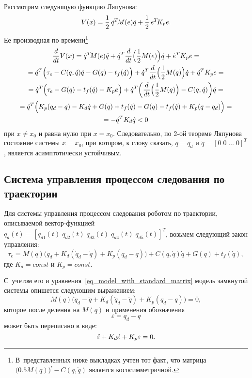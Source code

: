 Рассмотрим следующую функцию Ляпунова:
\begin{equation}
    V(x) = \frac{1}{2} \, \dot{q}^T \! M(e) \dot{q} + \frac{1}{2} \, e^T \! K_p e \ldotp
\end{equation}
Ее производная по времени\footnote{В~представленных ниже выкладках учтен тот факт, что матрица \linebreak $\bigl( 0.5 M(q) \bigr)^\centerdot \!\! - C(q,\dot{q})$ является кососимметричной.}
\begin{gather}
    \frac{d}{dt} V(x) = \dot{q}^T \! M(e) \ddot{q} + \dot{q}^T \frac{d}{dt} \Bigl( \frac{1}{2} M(e) \Bigr) \dot{q} + \dot{e}^T K_p e = \notag \\
    = \dot{q}^T \Bigl( \tau_e - C(q,\dot{q}) \dot{q} - G(q) - t_f(\dot{q}) \Bigr) + \dot{q}^T \frac{d}{dt} \Bigl( \frac{1}{2} M(q) \Bigr) \dot{q} + \dot{q}^T K_p e  = \notag\\
    = \dot{q}^T \Bigl( \tau_e - G(q) - t_f(\dot{q}) + K_p e\Bigr) + \dot{q}^T \biggl( \frac{d}{dt} \Bigl( \frac{1}{2} M(q) \Bigr) - C(q,\dot{q}) \biggr) \dot{q} = \notag \\
    = \dot{q}^T \Bigl(K_p (q_d - q) - K_d \dot{q} + G(q) + t_f(\dot{q}) - G(q) - t_f(\dot{q}) + K_p (q - q_d) \Bigr) = \notag \\
    = -\dot{q}^T K_d \dot{q} < 0
\end{gather}
при $x \ne x_0$ и равна нулю при $x = x_0$.
Следовательно, по 2-ой теореме Ляпунова состояние системы $x = x_0$, при котором, к слову сказать, $q = q_d$ и $\dot{q} = [0\;0\;\ldots\;0]^T$, является асимптотически устойчивым.

\subsection{Система управления процессом следования по траектории}
Для системы управления процессом следования роботом по траектории, описываемой вектор-функцией $q_d(t) = \left[ q_{d1}(t) \; q_{d2}(t) \; q_{d3}(t) \; q_{d4}(t) \; q_{d5}(t) \right]^T$\!\!\!,\; возьмем следующий закон управления:
\begin{equation}\label{eq_trajectory_tracking_control_law}
    \tau_e = M(q) \bigl( \ddot{q}_d + K_d (\dot{q}_d - \dot{q})+  K_p (q_d - q) \bigr) + C(q,\dot{q}) \dot{q} + G(q) + t_f(\dot{q}),
\end{equation}
где $K_d = const$ и $K_p = const$.

С~учетом его и уравнения~\eqref{eq_model_with_standard_matrix} модель замкнутой системы опишется следующим выражением:
\begin{equation}
    M(q) \bigl( \ddot{q}_d - \ddot{q} + K_d (\dot{q}_d - \dot{q})+  K_p (q_d - q) \bigr) = 0,
\end{equation}
которое после деления на $M(q)$ и применения обозначения
\begin{equation}
    \varepsilon = q_d - q
\end{equation}
может быть переписано в виде:
\begin{equation}\label{eq_trajectory_tracking_closed_loop}
    \ddot{\varepsilon} + K_d \dot{\varepsilon} +  K_p \varepsilon = 0 \ldotp
\end{equation}

